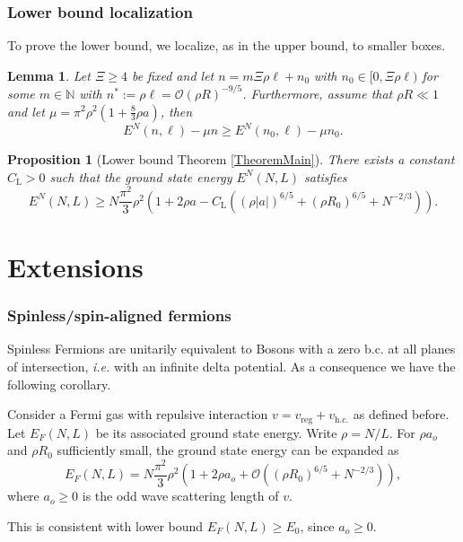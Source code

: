 \documentclass{beamer}[10]
\newcommand{\abs}[1]{\left\lvert #1 \right\rvert}
\newcommand{\ie}{\emph{i.e.} }
\newtheorem{mproposition}{Proposition}
\newtheorem{mlemma}{Lemma}
\begin{document}
\begin{frame}
	\frametitle{Lower bound localization}
	\begin{block}{}
	\small	To prove the lower bound, we localize, as in the upper bound, to smaller boxes.
		\begin{mlemma}\label{LemmaLocalizationFbound}
			Let $ \Xi\geq 4 $ be fixed and let $ n=m\Xi \rho \ell+n_0 $ with $ n_0\in[0,\Xi\rho \ell) $ for some $ m\in\mathbb{N} $ with $ n^{\ast}:=\rho\ell=\mathcal{O}(\rho R)^{-9/5} $. Furthermore, assume that $ \rho R\ll 1 $ and let $ \mu=\pi^2\rho^2\left(1+\frac{8}{3}\rho a\right) $, then \begin{equation}
			E^{N}(n,\ell)-\mu n \geq E^{N}(n_0,\ell)-\mu n_0.
			\end{equation}
		\end{mlemma}
		\begin{mproposition}[Lower bound Theorem \ref{TheoremMain}]
			\label{PropositionLowerBound}
			There exists a constant $C_\text{L}>0$ such that the ground state energy $E^N(N,L)$ satisfies
			\begin{equation}
			\label{eqlower}
			E^N(N,L)\geq N\frac{\pi^2}{3}\rho^2\left(1+2\rho a-C_\text{L}\left((\rho\abs{a})^{6/5}+(\rho R_0)^{6/5}+N^{-2/3}\right)\right).
			\end{equation}
		\end{mproposition}
	\end{block}	
\end{frame}
\section{Extensions}
\begin{frame}
	\frametitle{Spinless/spin-aligned fermions}
	Spinless Fermions are unitarily equivalent to Bosons with a zero b.c. at all planes of intersection, \ie with an infinite delta potential. As a consequence we have the following corollary. 
	\begin{theorem}\label{TheoremFermion}
		Consider a Fermi gas with repulsive interaction  $v=v_{\text{reg}}+v_{\text{h.c.}}$ as defined before. Let $ E_F(N,L)$ be its associated ground state energy. Write $\rho=N/L$. For $\rho a_o$ and $\rho R_0$ sufficiently small, the ground state energy can be expanded as 
		\begin{equation}
		E_F(N,L)=N\frac{\pi^2}{3}\rho^2\left(1+2\rho a_o+\mathcal{O}\left(\left(\rho R_0\right)^{6/5}+N^{-2/3}\right)\right),
		\end{equation}
		where $ a_o\geq0 $ is the odd wave scattering length of $v$. 
	\end{theorem} 
	This is consistent with lower bound $ E_F(N,L)\geq E_0 $, since $ a_o\geq 0 $.
\end{frame}
\end{document}
